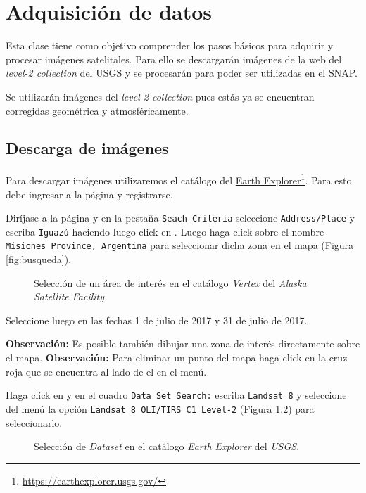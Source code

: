 \chapter{Adquisición de datos}

Esta clase tiene como objetivo comprender los pasos básicos para adquirir y procesar imágenes satelitales. Para ello se descargarán imágenes de la web del \emph{level-2 collection} del USGS y se procesarán para poder ser utilizadas en el SNAP.

Se utilizarán imágenes del \emph{level-2 collection} pues estás ya se encuentran corregidas geométrica y atmosféricamente.

\section{Descarga de imágenes}

Para descargar imágenes utilizaremos el catálogo del \href{https://earthexplorer.usgs.gov/}{Earth Explorer}\footnote{\href{https://earthexplorer.usgs.gov/}{https://earthexplorer.usgs.gov/}}. Para esto debe ingresar a la página y registrarse.

Diríjase a la página y en la pestaña \texttt{Seach Criteria} seleccione \texttt{Address/Place} y escriba \texttt{Iguazú} haciendo luego click en  . Luego haga click sobre el nombre \texttt{Misiones Province, Argentina} para seleccionar dicha zona en el mapa (Figura \ref{fig:busqueda}).

\begin{figure}[h!]
    \centering
    \caption{Selección de un área de interés en el catálogo \emph{Vertex} del \emph{Alaska Satellite Facility}}
    \label{fig:region}
\end{figure}

Seleccione luego en  las fechas 1 de julio de 2017 y 31 de julio de 2017.

\textbf{Observación:} Es posible también dibujar una zona de interés directamente sobre el mapa.
\textbf{Observación:} Para eliminar un punto del mapa haga click en la cruz roja que se encuentra al lado de el en el menú.

Haga click en  y en el cuadro \texttt{Data Set Search:} escriba \texttt{Landsat 8} y seleccione del menú la opción \texttt{Landsat 8 OLI/TIRS C1 Level-2} (Figura \ref{fig:dataset}) para seleccionarlo.

\begin{figure}[h!]
    \centering
    \caption{Selección de \emph{Dataset} en el catálogo \emph{Earth Explorer} del \emph{USGS}.}
    \label{fig:dataset}
\end{figure}

